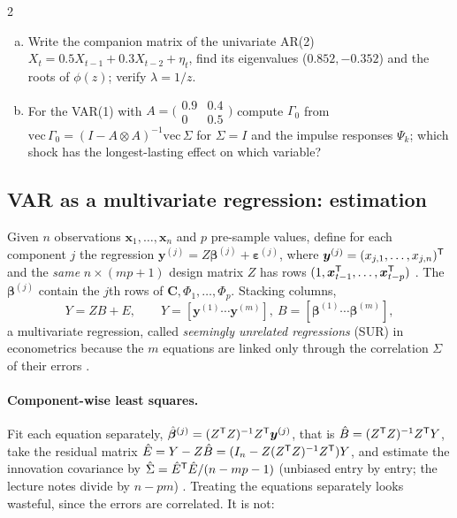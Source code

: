 \begin{paracol}{2}
\begin{exercise}\label{ch09:ex-x-companion}
\leavevmode
\begin{enumerate}[(a)]
  \item Write the companion matrix of the univariate AR(2) $X_t=0.5X_{t-1}+0.3X_{t-2}+\eta_t$, find its eigenvalues ($0.852,-0.352$) and the roots of $\phi(z)$; verify $\lambda=1/z$.
  \item For the VAR(1) with $A=\bigl(\begin{smallmatrix}0.9&0.4\\0&0.5\end{smallmatrix}\bigr)$ compute $\Gamma_0$ from $\mathrm{vec}\,\Gamma_0=(I-A\otimes A)^{-1}\mathrm{vec}\,\Sigma$ for $\Sigma=I$ and the impulse responses $\Psi_k$;
      which shock has the longest-lasting effect on which variable?
\end{enumerate}
\end{exercise}

\subsection{VAR as a multivariate regression: estimation}\label{ch09:sec-varest}
Given $n$ observations $\bm x_1,\dots,\bm x_n$ and $p$ pre-sample values, define for each component $j$ the regression
$\bm y^{(j)}=Z\bm\beta^{(j)}+\bm\varepsilon^{(j)}$, where $\bm y^{(j)}=(x_{j,1},\dots,x_{j,n})^{\mathsf T}$ and the \emph{same}
$n\times(mp+1)$ design matrix $Z$ has rows $(1,\bm x_{t-1}^{\mathsf T},\dots,\bm x_{t-p}^{\mathsf T})$ . The $\bm\beta^{(j)}$ contain the
$j$th rows of $\bm C,\Phi_1,\dots,\Phi_p$. Stacking columns,
\begin{equation}\label{ch09:eq-mvreg}
  Y=ZB+E,\qquad Y=[\bm y^{(1)}\cdots\bm y^{(m)}],\ B=[\bm\beta^{(1)}\cdots\bm\beta^{(m)}],
\end{equation}
a multivariate regression, called \emph{seemingly unrelated regressions} (SUR) in econometrics because the $m$ equations are
linked only through the correlation $\Sigma$ of their errors .

\paragraph{Component-wise least squares.} Fit each equation separately,
$\hat{\bm\beta}^{(j)}=(Z^{\mathsf T} Z)^{-1}Z^{\mathsf T}\bm y^{(j)}$, that is $\hat B=(Z^{\mathsf T} Z)^{-1}Z^{\mathsf T} Y$, take the residual matrix
$\hat E=Y-Z\hat B=(I_n-Z(Z^{\mathsf T} Z)^{-1}Z^{\mathsf T})Y$, and estimate the innovation covariance by
$\hat\Sigma=\hat E^{\mathsf T}\hat E/(n-mp-1)$ (unbiased entry by entry; the lecture notes divide by $n-pm$) .
Treating the equations separately looks wasteful, since the errors are correlated. It is not:


\end{paracol}
